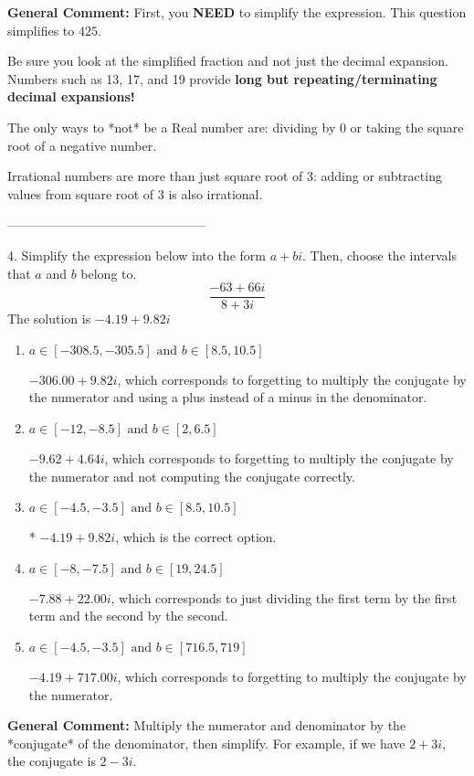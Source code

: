 \documentclass{extbook}[14pt]
\begin{document}
\textbf{General Comment:} First, you \textbf{NEED} to simplify the expression. This question simplifies to $425$. 
 
 Be sure you look at the simplified fraction and not just the decimal expansion. Numbers such as 13, 17, and 19 provide \textbf{long but repeating/terminating decimal expansions!} 
 
 The only ways to *not* be a Real number are: dividing by 0 or taking the square root of a negative number. 
 
 Irrational numbers are more than just square root of 3: adding or subtracting values from square root of 3 is also irrational. 

-----------------------------------------------

4. Simplify the expression below into the form $a+bi$. Then, choose the intervals that $a$ and $b$ belong to.
\[ \frac{-63 + 66 i}{8 + 3 i} \] 
The solution is $ -4.19  + 9.82 i $ 

\begin{enumerate}[label=\Alph*.] 
\item $ a \in [-308.5, -305.5] \text{ and } b \in [8.5, 10.5] $ 

  $-306.00  + 9.82 i$, which corresponds to forgetting to multiply the conjugate by the numerator and using a plus instead of a minus in the denominator. 
\item $ a \in [-12, -8.5] \text{ and } b \in [2, 6.5] $ 

  $-9.62  + 4.64 i$, which corresponds to forgetting to multiply the conjugate by the numerator and not computing the conjugate correctly. 
\item $ a \in [-4.5, -3.5] \text{ and } b \in [8.5, 10.5] $ 

 * $-4.19  + 9.82 i$, which is the correct option. 
\item $ a \in [-8, -7.5] \text{ and } b \in [19, 24.5] $ 

  $-7.88  + 22.00 i$, which corresponds to just dividing the first term by the first term and the second by the second. 
\item $ a \in [-4.5, -3.5] \text{ and } b \in [716.5, 719] $ 

  $-4.19  + 717.00 i$, which corresponds to forgetting to multiply the conjugate by the numerator. 
\end{enumerate} 
 
\textbf{General Comment:} Multiply the numerator and denominator by the *conjugate* of the denominator, then simplify. For example, if we have $2+3i$, the conjugate is $2-3i$. 
\end{document}

